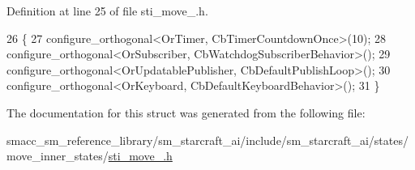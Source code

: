 Definition at line 25 of file sti\+\_\+move\+\_.\+h.


\begin{DoxyCode}
26   \{
27     configure\_orthogonal<OrTimer, CbTimerCountdownOnce>(10);
28     configure\_orthogonal<OrSubscriber, CbWatchdogSubscriberBehavior>();
29     configure\_orthogonal<OrUpdatablePublisher, CbDefaultPublishLoop>();
30     configure\_orthogonal<OrKeyboard, CbDefaultKeyboardBehavior>();
31   \}
\end{DoxyCode}


The documentation for this struct was generated from the following file\+:\begin{DoxyCompactItemize}
\item 
smacc\+\_\+sm\+\_\+reference\+\_\+library/sm\+\_\+starcraft\+\_\+ai/include/sm\+\_\+starcraft\+\_\+ai/states/move\+\_\+inner\+\_\+states/\hyperlink{sti__move__2_8h}{sti\+\_\+move\+\_.\+h}\end{DoxyCompactItemize}
